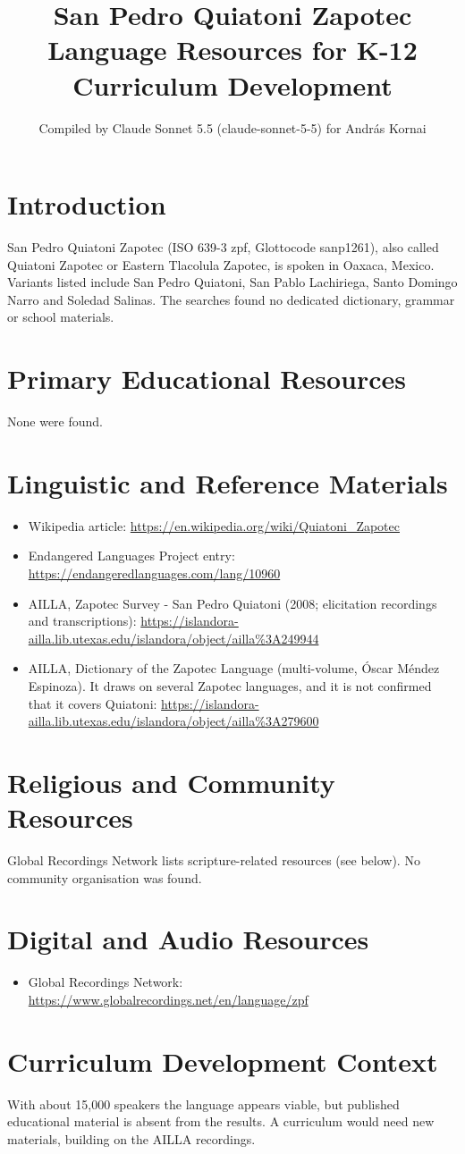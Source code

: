 \documentclass[12pt]{article}
\title{San Pedro Quiatoni Zapotec Language Resources for K-12 Curriculum Development}
\author{Compiled by Claude Sonnet 5.5 (claude-sonnet-5-5) for Andr\'as Kornai}
\date{}
\begin{document}
\maketitle

\section{Introduction}
San Pedro Quiatoni Zapotec (ISO 639-3 zpf, Glottocode sanp1261), also called Quiatoni Zapotec or Eastern Tlacolula Zapotec, is spoken in Oaxaca, Mexico. Variants listed include San Pedro Quiatoni, San Pablo Lachiriega, Santo Domingo Narro and Soledad Salinas. The searches found no dedicated dictionary, grammar or school materials.

\section{Primary Educational Resources}
None were found.

\section{Linguistic and Reference Materials}
\begin{itemize}
\item Wikipedia article: \url{https://en.wikipedia.org/wiki/Quiatoni_Zapotec}
\item Endangered Languages Project entry: \url{https://endangeredlanguages.com/lang/10960}
\item AILLA, Zapotec Survey - San Pedro Quiatoni (2008; elicitation recordings and transcriptions): \url{https://islandora-ailla.lib.utexas.edu/islandora/object/ailla%3A249944}
\item AILLA, Dictionary of the Zapotec Language (multi-volume, \'Oscar M\'endez Espinoza). It draws on several Zapotec languages, and it is not confirmed that it covers Quiatoni: \url{https://islandora-ailla.lib.utexas.edu/islandora/object/ailla%3A279600}
\end{itemize}

\section{Religious and Community Resources}
Global Recordings Network lists scripture-related resources (see below). No community organisation was found.

\section{Digital and Audio Resources}
\begin{itemize}
\item Global Recordings Network: \url{https://www.globalrecordings.net/en/language/zpf}
\end{itemize}

\section{Curriculum Development Context}
With about 15,000 speakers the language appears viable, but published educational material is absent from the results. A curriculum would need new materials, building on the AILLA recordings.
\end{document}
